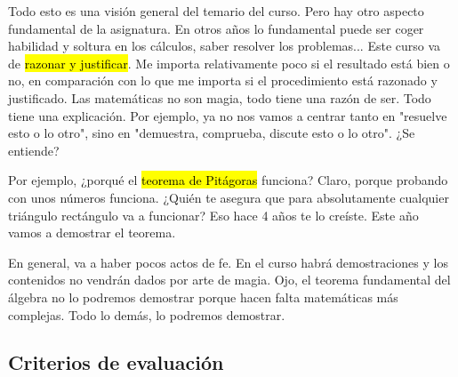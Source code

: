 \documentclass[palatino,nosec]{Docencia}
\begin{document}
Todo esto es una visión general del temario del curso. 
%
Pero hay otro aspecto fundamental de la asignatura. 
%
En otros años lo fundamental puede ser coger habilidad y soltura en los cálculos, saber resolver los problemas... 
%
Este curso va de \hl{razonar y justificar}. Me importa relativamente poco si el resultado está bien o no, en comparación con lo que me importa si el procedimiento está razonado y justificado. 
%
Las matemáticas no son magia, todo tiene una razón de ser. Todo tiene una explicación. 
%
Por ejemplo, ya no nos vamos a centrar tanto en "resuelve esto o lo otro", sino en "demuestra, comprueba, discute esto o lo otro".
%
¿Se entiende?

Por ejemplo, ¿porqué el \hl{teorema de Pitágoras} funciona? 
%
Claro, porque probando con unos números funciona. 
%
¿Quién te asegura que para absolutamente cualquier triángulo rectángulo va a funcionar? Eso hace 4 años te lo creíste. 
%
Este año vamos a demostrar el teorema.

En general, va a haber pocos actos de fe. 
%
En el curso habrá demostraciones y los contenidos no vendrán dados por arte de magia. 
%
Ojo, el teorema fundamental del álgebra no lo podremos demostrar porque hacen falta matemáticas más complejas. 
%
Todo lo demás, lo podremos demostrar.

\subsection{Criterios de evaluación}







\printindex
\end{document}

